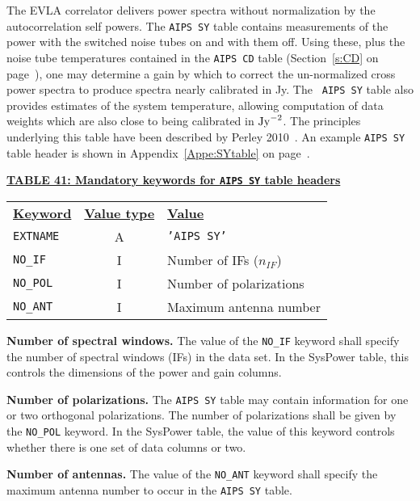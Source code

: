 \documentclass[twoside]{article}
\newcommand{\nif}{$n_{IF}$}
\begin{document}
The EVLA correlator delivers power spectra without normalization by
the autocorrelation self powers.  The {\tt AIPS SY} table contains
measurements of the power with the switched noise tubes on and with
them off.  Using these, plus the noise tube temperatures contained in
the {\tt AIPS CD} table (Section~\ref{s:CD} on page~\pageref{s:CD}),
one may determine a gain by which to correct the un-normalized cross
power spectra to produce spectra nearly calibrated in Jy.  The {\tt
  AIPS SY} table also provides estimates of the system temperature,
allowing computation of data weights which are also close to being
calibrated in ${\rm Jy}^{-2}$.  The principles underlying this table
have been described by Perley 2010~\cite{RP10}.  An example {\tt AIPS
  SY} table header is shown in Appendix~\ref{Appe:SYtable} on
page~\pageref{Appe:SYtable}.

\begin{center}
\underline{\bf{TABLE 41: Mandatory keywords for {\tt AIPS SY} table
    headers}}\\
\begin{tabular}{lcl}
\noalign{\vspace{2pt}} \label{ta:SYkeys}
\underline{{\bf Keyword}} & \underline{\bf{Value type}} &
    \underline{\bf{Value\vphantom{y}}} \\
\noalign{\vspace{2pt}}
{\tt EXTNAME}   & A & {\tt 'AIPS SY'}  \\
{\tt NO\_IF}    & I & Number of IFs (\nif)\\
{\tt NO\_POL}   & I & Number of polarizations \\
{\tt NO\_ANT}   & I & Maximum antenna number
\end{tabular}
\end{center}

{\bf Number of spectral windows.} The value of the {\tt NO\_IF}
keyword shall specify the number of spectral windows (IFs) in the data
set.  In the SysPower table, this controls the dimensions of the
power and gain columns.

{\bf Number of polarizations.}  The {\tt AIPS SY} table may contain
information for one or two orthogonal polarizations.  The number of
polarizations shall be given by the {\tt NO\_POL} keyword.   In the
SysPower table, the value of this keyword controls whether there is
one set of data columns or two.

{\bf Number of antennas.} The value of the {\tt NO\_ANT} keyword shall
specify the maximum antenna number to occur in the {\tt AIPS SY} table.
\vfill\eject
\end{document}
